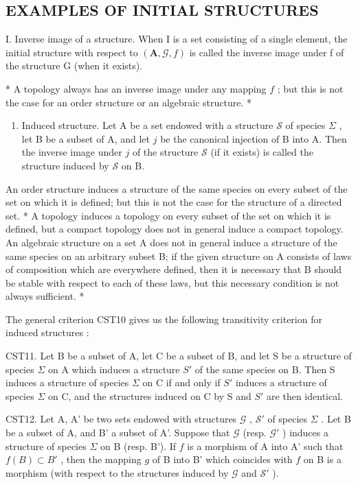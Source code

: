 \subsection{EXAMPLES OF INITIAL STRUCTURES}

I. Inverse image of a structure. When I is a set consisting of a single element, the initial structure with respect to \((\mathbf{A}, \mathcal{G}, f)\) is called the inverse image under f of the structure G (when it exists).

* A topology always has an inverse image under any mapping \(f\) ; but this is not the case for an order structure or an algebraic structure. *

\begin{enumerate}
\def\labelenumi{\Roman{enumi}.}
\setcounter{enumi}{1}
\tightlist
\item
  Induced structure. Let A be a set endowed with a structure \(\mathcal{S}\) of species \(\Sigma\) , let B be a subset of A, and let \(j\) be the canonical injection of B into A. Then the inverse image under \(j\) of the structure \(\mathcal{S}\) (if it exists) is called the structure induced by \(\mathcal{S}\) on B.
\end{enumerate}

An order structure induces a structure of the same species on every subset of the set on which it is defined; but this is not the case for the structure of a directed set. * A topology induces a topology on every subset of the set on which it is defined, but a compact topology does not in general induce a compact topology. An algebraic structure on a set A does not in general induce a structure of the same species on an arbitrary subset B; if the given structure on A consists of laws of composition which are everywhere defined, then it is necessary that B should be stable with respect to each of these laws, but this necessary condition is not always sufficient. *

The general criterion CST10 gives us the following transitivity criterion for induced structures :

CST11. Let B be a subset of A, let C be a subset of B, and let S be a structure of species \(\Sigma\) on A which induces a structure \(S'\) of the same species on B. Then S induces a structure of species \(\Sigma\) on C if and only if \(S'\) induces a structure of species \(\Sigma\) on C, and the structures induced on C by S and \(S'\) are then identical.

CST12. Let A, A' be two sets endowed with structures \(\mathcal{G}\) , \(\mathcal{S}'\) of species \(\Sigma\) . Let B be a subset of A, and B' a subset of A'. Suppose that \(\mathcal{G}\) (resp. \(\mathcal{G}'\) ) induces a structure of species \(\Sigma\) on B (resp. B'). If \(f\) is a morphism of A into A' such that \(f(B) \subset B'\) , then the mapping \(g\) of B into B' which coincides with \(f\) on B is a morphism (with respect to the structures induced by \(\mathcal{G}\) and \(\mathcal{S}'\) ).

